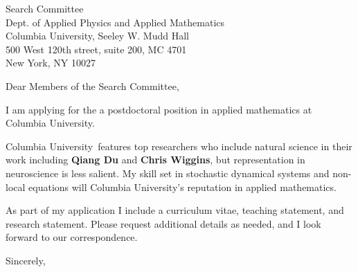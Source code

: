\documentclass[11pt,a4paper]{letter}
\begin{document}

\def\School{Columbia University}

\begin{letter}
{Search Committee\\
Dept. of Applied Physics and Applied Mathematics\\
Columbia University, Seeley W. Mudd Hall\\
500 West 120th street, suite 200, MC 4701\\
New York, NY 10027
}


\opening{Dear Members of the Search Committee,}

I am applying for the a postdoctoral position in applied mathematics at \School. 



\School~features top researchers who include natural science in their work including \textbf{Qiang Du} and \textbf{Chris Wiggins}, but representation in neuroscience is less salient. My skill set in stochastic dynamical systems and non-local equations will  \School's reputation in applied mathematics.



As part of my application I include a curriculum vitae, teaching statement, and research statement. Please request additional details as needed, and I look forward to our correspondence.

\closing{Sincerely,}
\end{letter}
\end{document}
